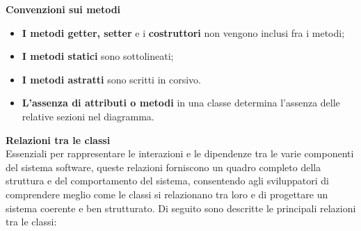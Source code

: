 \textbf{Convenzioni sui metodi}
\begin{itemize}
	\item \textbf{I metodi getter, setter} e i \textbf{costruttori} non vengono inclusi fra i metodi;
	\item \textbf{I metodi statici} sono sottolineati;
	\item \textbf{I metodi astratti} sono scritti in corsivo.
	\item \textbf{L'assenza di attributi o metodi} in una classe determina l'assenza delle relative sezioni nel diagramma.
\end{itemize}
\textbf{Relazioni tra le classi}\\
Essenziali per rappresentare le interazioni e le dipendenze tra le varie componenti del sistema software, queste relazioni forniscono un quadro completo della struttura e del comportamento del sistema, consentendo agli sviluppatori di comprendere meglio come le classi si relazionano tra loro e di progettare un sistema coerente e ben strutturato. Di seguito sono descritte le principali relazioni tra le classi:
